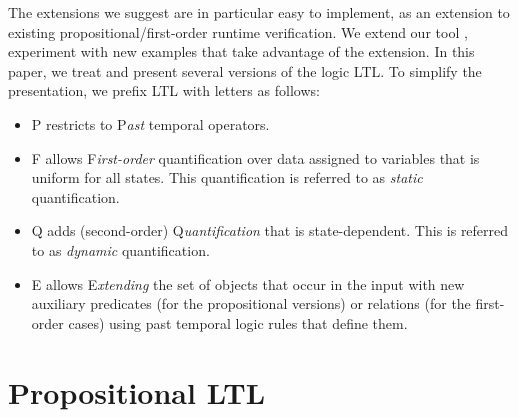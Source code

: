The extensions we suggest are in particular easy to implement, as an extension to existing propositional/first-order runtime verification. We extend our tool \dejavu, experiment with new examples that take advantage of the extension.
\fi
\vspace{1ex}
\label{sec:prelim}
In this paper, we treat and present several versions of the logic LTL. To simplify
the presentation, we prefix LTL with letters as follows:

\begin{itemize}
\item{P} restricts to P{\em ast} temporal operators.
\item{F} allows F{\em irst-order} quantification over
data assigned to variables that is uniform for all states. This quantification is referred to as {\em static} quantification.
\item{Q} adds (second-order) Q{\em uantification} that is state-dependent. This is referred to as {\em dynamic} quantification.
\item{E} allows E{\em xtending} the 
set of objects that occur in the input with
new auxiliary predicates (for the propositional versions) or relations (for the first-order cases) using past temporal logic rules that define them.
\end{itemize}







\newcommand\eventty{\mathbb{E}}
\newcommand\setof[1]{\mathcal{P}(#1)}


\section{Propositional LTL}
\label{propLTL}


